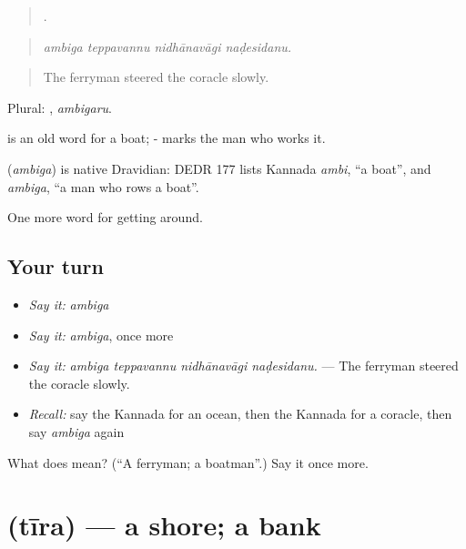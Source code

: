 \begin{quote}
   .
\end{quote}

\begin{quote}
\emph{ambiga teppavannu nidhānavāgi naḍesidanu.}
\end{quote}

\begin{quote}
The ferryman steered the coracle slowly.
\end{quote}

Plural: , \emph{ambigaru}.

 is an old word for a boat; - marks the man who works it.

\begin{cousinweb}
\textbf{} (\emph{ambiga}) is native Dravidian: DEDR 177 lists Kannada \emph{ambi}, \textquotedblleft{}a boat\textquotedblright{}, and \emph{ambiga}, \textquotedblleft{}a man who rows a boat\textquotedblright{}.
\end{cousinweb}

\begin{grammarlens}[title={What you've built}]
One more word for getting around.
\end{grammarlens}

\subsection*{Your turn}
\begin{itemize}
\raggedright
  \item \emph{Say it:} \emph{ambiga}
  \item \emph{Say it:} \emph{ambiga}, once more
  \item \emph{Say it:} \emph{ambiga teppavannu nidhānavāgi naḍesidanu.} — The ferryman steered the coracle slowly.
  \item \emph{Recall:} say the Kannada for an ocean, then the Kannada for a coracle, then say \emph{ambiga} again
\end{itemize}

\begin{tcolorbox}[breakable,colback=teal!4,colframe=teal!35!black,title={Before you move on}]
What does  mean? (\textquotedblleft{}A ferryman; a boatman\textquotedblright{}.) Say it once more.
\end{tcolorbox}
\section[\texorpdfstring{\kn{ತೀರ} (tīra)}{ತೀರ (tīra)}]{ (tīra) — a shore; a bank}

